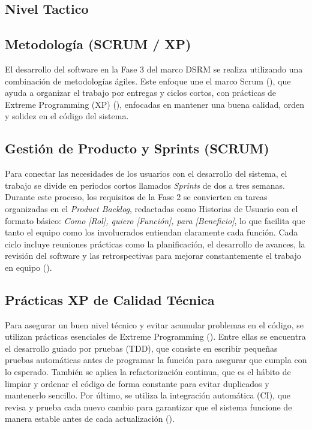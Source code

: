 \newpage
\subsection{Nivel Tactico}

\subsection {Metodología (SCRUM / XP)}

El desarrollo del software en la Fase 3 del marco DSRM se realiza utilizando una combinación de metodologías ágiles. Este enfoque une el marco Scrum (\cite{schwaber2020guia}), que ayuda a organizar el trabajo por entregas y ciclos cortos, con prácticas de Extreme Programming (XP) (\cite{beck2000extreme}), enfocadas en mantener una buena calidad, orden y solidez en el código del sistema.

\subsection{Gestión de Producto y Sprints (SCRUM)}

Para conectar las necesidades de los usuarios con el desarrollo del sistema, el trabajo se divide en periodos cortos llamados \textit{Sprints} de dos a tres semanas. Durante este proceso, los requisitos de la Fase 2 se convierten en tareas organizadas en el \textit{Product Backlog}, redactadas como Historias de Usuario con el formato básico: \textit{Como [Rol], quiero [Función], para [Beneficio]}, lo que facilita que tanto el equipo como los involucrados entiendan claramente cada función. Cada ciclo incluye reuniones prácticas como la planificación, el desarrollo de avances, la revisión del software y las retrospectivas para mejorar constantemente el trabajo en equipo (\cite{schwaber2020guia}).

\subsection{Prácticas XP de Calidad Técnica}

Para asegurar un buen nivel técnico y evitar acumular problemas en el código, se utilizan prácticas esenciales de Extreme Programming (\cite{beck2000extreme}). Entre ellas se encuentra el desarrollo guiado por pruebas (TDD), que consiste en escribir pequeñas pruebas automáticas antes de programar la función para asegurar que cumpla con lo esperado. También se aplica la refactorización continua, que es el hábito de limpiar y ordenar el código de forma constante para evitar duplicados y mantenerlo sencillo. Por último, se utiliza la integración automática (CI), que revisa y prueba cada nuevo cambio para garantizar que el sistema funcione de manera estable antes de cada actualización (\cite{beck2000extreme}).


